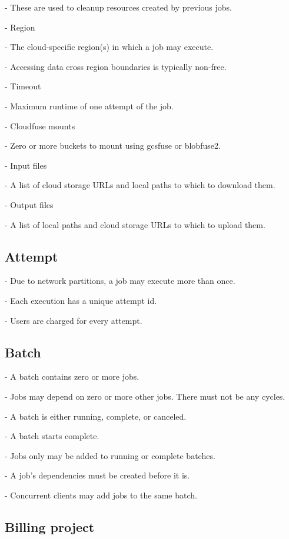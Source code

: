 \documentclass[sigconf, nonacm]{acmart}
\begin{document}
        - These are used to cleanup resources created by previous jobs.

      - Region

        - The cloud-specific region(s) in which a job may execute.

        - Accessing data cross region boundaries is typically non-free.

      - Timeout

        - Maximum runtime of one attempt of the job.

      - Cloudfuse mounts

        - Zero or more buckets to mount using gcsfuse or blobfuse2.

      - Input files

        - A list of cloud storage URLs and local paths to which to download them.

      - Output files

        - A list of local paths and cloud storage URLs to which to upload them.

\subsection{Attempt}

    - Due to network partitions, a job may execute more than once.

    - Each execution has a unique attempt id.

    - Users are charged for every attempt.

\subsection{Batch}

    - A batch contains zero or more jobs.

    - Jobs may depend on zero or more other jobs. There must not be any cycles.

    - A batch is either running, complete, or canceled.

    - A batch starts complete.

    - Jobs only may be added to running or complete batches.

    - A job’s dependencies must be created before it is.

    - Concurrent clients may add jobs to the same batch.

\subsection{Billing project}
\end{document}
